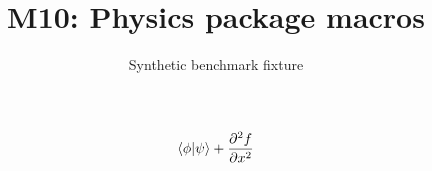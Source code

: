 \documentclass{article}
\title{M10: Physics package macros}
\author{Synthetic benchmark fixture}
\date{}
\begin{document}
\maketitle
\[\bra{\phi}\ket{\psi}+\pdv[2]{f}{x}\]
\end{document}

